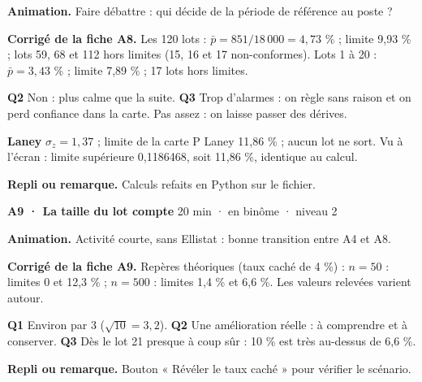 \textbf{Animation.} Faire débattre : qui décide de la période de référence au poste ?\par
\textbf{\color{ok}Corrigé de la fiche A8.} Les 120 lots : $\bar p = 851 / 18\,000 = 4{,}73$ \% ; limite 9,93 \% ; lots 59, 68 et 112 hors limites (15, 16 et 17 non-conformes). Lots 1 à 20 : $\bar p = 3{,}43$ \% ; limite 7,89 \% ; 17 lots hors limites.\par \textbf{Q2} Non : plus calme que la suite. \textbf{Q3} Trop d'alarmes : on règle sans raison et on perd confiance dans la carte. Pas assez : on laisse passer des dérives.\par \textbf{Laney} $\sigma_z = 1{,}37$ ; limite de la carte P Laney 11,86 \% ; aucun lot ne sort. Vu à l'écran : limite supérieure 0,1186468, soit 11,86 \%, identique au calcul.\par
{\small\textbf{Repli ou remarque.} Calculs refaits en Python sur le fichier.}\par
\vspace{3pt}
\begin{tcolorbox}[act]\textbf{A9 · La taille du lot compte} \hfill {\small 20 min · en binôme · niveau 2}\end{tcolorbox}
\textbf{Animation.} Activité courte, sans Ellistat : bonne transition entre A4 et A8.\par
\textbf{\color{ok}Corrigé de la fiche A9.} Repères théoriques (taux caché de 4 \%) : $n = 50$ : limites 0 et 12,3 \% ; $n = 500$ : limites 1,4 \% et 6,6 \%. Les valeurs relevées varient autour.\par \textbf{Q1} Environ par 3 ($\sqrt{10} = 3{,}2$). \textbf{Q2} Une amélioration réelle : à comprendre et à conserver. \textbf{Q3} Dès le lot 21 presque à coup sûr : 10 \% est très au-dessus de 6,6 \%.\par
{\small\textbf{Repli ou remarque.} Bouton « Révéler le taux caché » pour vérifier le scénario.}\par
\vspace{3pt}
